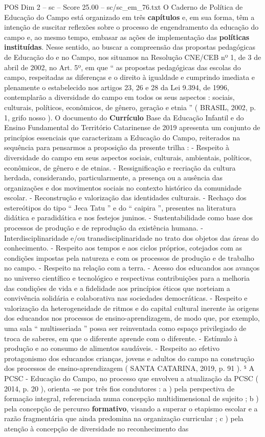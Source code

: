\begin{textsample}{POS Dim 2 – sc – Score 25.00 – sc/sc\_em\_76.txt}
O Caderno de Política de Educação do Campo está organizado em três \textbf{capítulos} e, em sua forma, têm a intenção de suscitar reflexões sobre o processo de engendramento da educação do campo e, ao mesmo tempo, embasar as ações de implementação das \textbf{políticas} \textbf{instituídas}.
Nesse sentido, ao buscar a compreensão das propostas pedagógicas de Educação do e no Campo, nos situamos na Resolução CNE/CEB nº 1, de 3 de abril de 2002, no Art. 5º, em que “ as propostas pedagógicas das escolas do campo, respeitadas as diferenças e o direito à igualdade e cumprindo imediata e plenamente o estabelecido nos artigos 23, 26 e 28 da Lei 9.394, de 1996, contemplarão a diversidade do campo em todos os seus aspectos : sociais, culturais, políticos, econômicos, de gênero, geração e etnia ” ( BRASIL, 2002, p. 1, grifo nosso ).
O documento do \textbf{Currículo} Base da Educação Infantil e do Ensino Fundamental do Território Catarinense de 2019 apresenta um conjunto de princípios essenciais que caracterizam a Educação do Campo, reiterados na sequência para pensarmos a proposição da presente trilha : - Respeito à diversidade do campo em seus aspectos sociais, culturais, ambientais, políticos, econômicos, de gênero e de etnias. - Ressignificação e recriação da cultura herdada, considerando, particularmente, a presença ou a ausência das organizações e dos movimentos sociais no contexto histórico da comunidade escolar. - Reconstrução e valorização das identidades culturais. - Rechaço dos estereótipos do tipo “ Jeca Tatu ” e do “ caipira ”, presentes na literatura didática e paradidática e nos festejos juninos. - Sustentabilidade como base dos processos de produção e de reprodução da existência humana. - Interdisciplinaridade e/ou transdisciplinaridade no trato dos objetos das áreas do conhecimento. - Respeito aos tempos e aos ciclos próprios, cotejados com as condições impostas pela natureza e com os processos de produção e de trabalho no campo. - Respeito na relação com a terra. - Acesso dos educandos aos avanços no universo científico e tecnológico e respectivas contribuições para a melhoria das condições de vida e a fidelidade aos princípios éticos que norteiam a convivência solidária e colaborativa nas sociedades democráticas. - Respeito e valorização da heterogeneidade de ritmos e do capital cultural inerente às origens dos educandos nos processos de ensino-aprendizagem, de modo que, por exemplo, uma sala “ multisseriada ” possa ser reinventada como espaço privilegiado de troca de saberes, em que o diferente aprende com o diferente. - Estímulo à produção e ao consumo de alimentos saudáveis. - Respeito ao efetivo protagonismo dos educandos crianças, jovens e adultos do campo na construção dos processos de ensino-aprendizagem ( SANTA CATARINA, 2019, p. 91 ). ⁵ A PCSC - Educação do Campo, no processo que envolveu a atualização da PCSC ( 2014, p. 20 ), orienta -se por três fios condutores : a ) pela perspectiva de formação integral, referenciada numa concepção multidimensional de sujeito ; b ) pela concepção de percurso \textbf{formativo}, visando a superar o etapismo escolar e a razão fragmentária que ainda predomina na organização curricular ; c ) pela atenção à concepção de diversidade no reconhecimento das 
\end{textsample}
